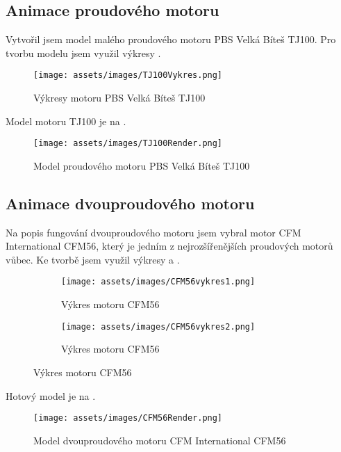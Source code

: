 \subsection{Animace proudového motoru}
{Vytvořil jsem model malého proudového motoru PBS Velká Bíteš TJ100. Pro tvorbu modelu jsem využil výkresy .}
\begin{figure}[H]
    \centering
    \texttt{[image: assets/images/TJ100Vykres.png]}
    \caption{Výkresy motoru PBS Velká Bíteš TJ100 \cite[přeloženo]{PBS:Minijets}}
    \label{obr:PBSTJ100Vykres}
\end{figure}
{Model motoru TJ100 je na .}
\begin{figure}[H]
    \centering
    \texttt{[image: assets/images/TJ100Render.png]}
    \caption{Model proudového motoru PBS Velká Bíteš TJ100 \jaObr}
    \label{obr:TJ100Render}
\end{figure}
\newpage
\subsection{Animace dvouproudového motoru}
{Na popis fungování dvouproudového motoru jsem vybral motor CFM International CFM56, který je jedním z nejrozšířenějších proudových motorů vůbec. Ke tvorbě jsem využil výkresy  a .}
\begin{figure}[H]
    \centering
    \begingroup
    \makeatletter
    \renewcommand\thesubfigure{\thefigure~--~\@nameuse{subfiglabel@\alph{subfigure}}}
    \newcommand{\subfiglabel@a}{vlevo}
    \newcommand{\subfiglabel@b}{vpravo}
    \captionsetup[subfigure]{labelformat=simple, labelsep=colon}
    \renewcommand\p@subfigure{}
    \makeatother
    \begin{subfigure}{.42\textwidth}
        \centering
        \texttt{[image: assets/images/CFM56vykres1.png]}
        \caption{Výkres motoru CFM56 \cite{RG:ReducedOrderModel}}
        \label{obr:CFM56vykres1}
    \end{subfigure}\hfill
    \begin{subfigure}{.55\textwidth}
        \centering
        \texttt{[image: assets/images/CFM56vykres2.png]}
        \caption{Výkres motoru CFM56 \cite[upraveno]{TL:OffDesignPerformancePrediction}}
        \label{obr:CFM56vykres2}
    \end{subfigure}
    \endgroup
\end{figure}
{Hotový model je na .}
\begin{figure}[H]
    \centering
    \texttt{[image: assets/images/CFM56Render.png]}
    \caption{Model dvouproudového motoru CFM International CFM56 \jaObr}
    \label{obr:CFM56Render}
\end{figure}
